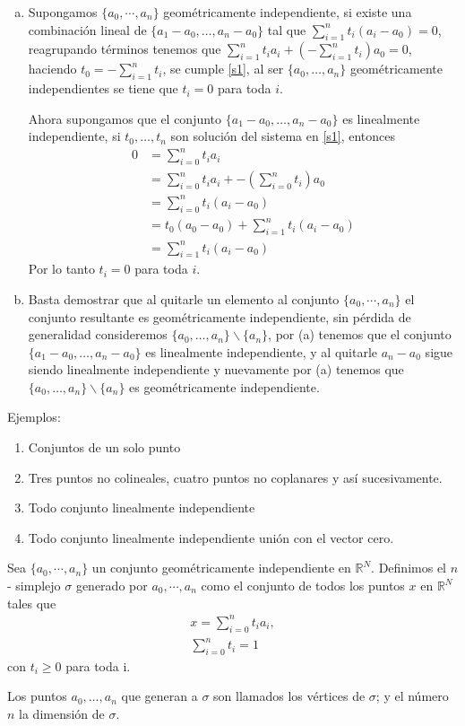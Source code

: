 \begin{Dem}
\begin{enumerate}[(a)]
\item Supongamos $\{a_0,\cdots,a_n\}$ geométricamente independiente, si existe una combinación lineal de $\{a_1-a_0,\ldots,a_n-a_0\}$ tal que $\sum_{i=1}^{n}t_i(a_i-a_0)=0$, reagrupando términos tenemos que $\sum_{i=1}^{n}t_ia_i + (-\sum_{i=1}^{n}t_i)a_0=0$, haciendo $t_0 = -\sum_{i=1}^{n}t_i$, se cumple \ref{s1}, al ser $\{a_0,\ldots,a_n\}$ geométricamente independientes se tiene que $t_i=0$ para toda $i$.

Ahora supongamos que el conjunto $\{a_1-a_0,\ldots,a_n-a_0\}$ es linealmente independiente, si $t_0,\ldots,t_n$ son solución del sistema en \ref{s1}, entonces 
\begin{align*}
 0&=\sum_{i=0}^{n}t_ia_i\\
 &=\sum_{i=0}^{n}t_ia_i + -(\sum_{i=0}^{n}t_i)a_0\\
 &=\sum_{i=0}^{n}t_i(a_i-a_0)\\ 
 &= t_0(a_0-a_0) + \sum_{i=1}^{n}t_i(a_i-a_0)\\
 &=\sum_{i=1}^{n}t_i(a_i-a_0)
\end{align*}
Por lo tanto $t_i=0$ para toda $i$.
\item Basta demostrar que al quitarle un elemento al conjunto $\{a_0,\cdots,a_n\}$
el conjunto resultante es geométricamente independiente, sin pérdida
de generalidad consideremos $\{a_0,\ldots,a_n\}\backslash\{a_n\}$, por (a) tenemos que el
conjunto $\{a_1-a_0,\ldots,a_n-a_0\}$ es linealmente independiente, y al quitarle
$a_n-a_0$ sigue siendo linealmente independiente y nuevamente por (a) 
tenemos que $\{a_0,\ldots,a_n\}\backslash\{a_n\}$ es geométricamente independiente.
\end{enumerate}
\end{Dem}
Ejemplos:
\begin{enumerate}
\item Conjuntos de un solo punto
\item Tres puntos no colineales, cuatro puntos no coplanares y así sucesivamente.  
\item Todo conjunto linealmente independiente
\item Todo conjunto linealmente independiente unión con el vector cero. 
\end{enumerate}

\begin{Defi}[Simplejo]
Sea $\{a_0,\cdots,a_n\}$ un conjunto geométricamente independiente en  $\mathbb{R}^{N}$. Definimos el $n$- simplejo  $\sigma$ generado por $a_0,\cdots,a_n$ como el conjunto de todos los puntos $x$ en $\mathbb{R}^{N}$ tales que 
\begin{equation}\label{s2}
\begin{split}
x = \sum_{i=0}^{n}t_ia_i,\\
\sum_{i=0}^{n}t_i=1
\end{split}
\end{equation}
con $t_i\geqslant 0$ para toda i.

Los puntos $a_0,\ldots,a_n$ que generan a $\sigma$ son llamados los vértices de $\sigma$; y el número $n$ la dimensión de $\sigma$.
\end{Defi}

